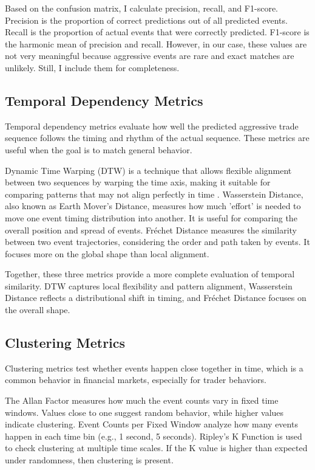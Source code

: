 Based on the confusion matrix, I calculate precision, recall, and F1-score. Precision is the proportion of correct predictions out of all predicted events. Recall is the proportion of actual events that were correctly predicted. F1-score is the harmonic mean of precision and recall. However, in our case, these values are not very meaningful because aggressive events are rare and exact matches are unlikely. Still, I include them for completeness.

\subsection{Temporal Dependency Metrics}
Temporal dependency metrics evaluate how well the predicted aggressive trade sequence follows the timing and rhythm of the actual sequence. These metrics are useful when the goal is to match general behavior.

Dynamic Time Warping (DTW) is a technique that allows flexible alignment between two sequences by warping the time axis, making it suitable for comparing patterns that may not align perfectly in time \citep{muller2007dtw}. Wasserstein Distance, also known as Earth Mover's Distance, measures how much 'effort' is needed to move one event timing distribution into another. It is useful for comparing the overall position and spread of events. Fréchet Distance measures the similarity between two event trajectories, considering the order and path taken by events. It focuses more on the global shape than local alignment.

Together, these three metrics provide a more complete evaluation of temporal similarity. DTW captures local flexibility and pattern alignment, Wasserstein Distance reflects a distributional shift in timing, and Fréchet Distance focuses on the overall shape.

\subsection{Clustering Metrics}
Clustering metrics test whether events happen close together in time, which is a common behavior in financial markets, especially for trader behaviors.

The Allan Factor measures how much the event counts vary in fixed time windows. Values close to one suggest random behavior, while higher values indicate clustering. Event Counts per Fixed Window analyze how many events happen in each time bin (e.g., 1 second, 5 seconds). Ripley's K Function is used to check clustering at multiple time scales. If the K value is higher than expected under randomness, then clustering is present.

